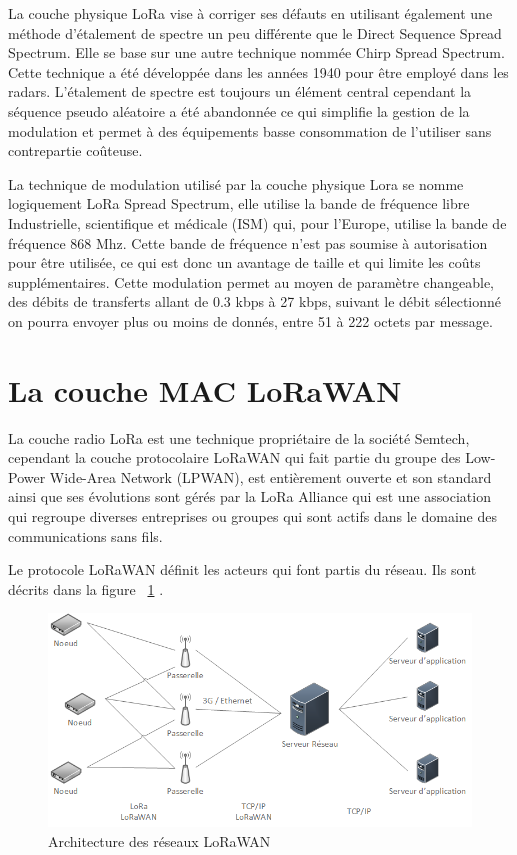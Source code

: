 La couche physique LoRa vise à corriger ses défauts en utilisant également une méthode d’étalement de spectre un peu différente que le Direct Sequence Spread Spectrum. Elle se base sur une autre technique nommée Chirp Spread Spectrum. Cette technique a été développée dans les années 1940 pour être employé dans les radars. L’étalement de spectre est toujours un élément central cependant la séquence pseudo aléatoire a été abandonnée ce qui simplifie la gestion de la modulation et permet à des équipements basse consommation de l’utiliser sans contrepartie coûteuse. \cite{lora_modulation_basics}

La technique de modulation utilisé par la couche physique Lora se nomme logiquement LoRa Spread Spectrum, elle utilise la bande de fréquence libre Industrielle, scientifique et médicale (ISM) qui, pour l’Europe, utilise la bande de fréquence 868 Mhz. Cette bande de fréquence n’est pas soumise à autorisation pour être utilisée, ce qui est donc un avantage de taille et qui limite les coûts supplémentaires. Cette modulation permet au moyen de paramètre changeable, des débits de transferts allant de 0.3 kbps à 27 kbps, suivant le débit sélectionné on pourra envoyer plus ou moins de donnés, entre 51 à 222 octets par message. \cite{limits_lorawan}

\section{La couche MAC LoRaWAN}

La couche radio LoRa est une technique propriétaire de la société Semtech, cependant la couche protocolaire LoRaWAN qui fait partie du groupe des Low-Power Wide-Area Network (LPWAN), est entièrement ouverte et son standard ainsi que ses évolutions sont gérés par la LoRa Alliance qui est une association qui regroupe diverses entreprises ou groupes qui sont actifs dans le domaine des communications sans fils.

Le protocole LoRaWAN définit les acteurs qui font partis du réseau. Ils sont décrits dans la figure ~\ref{fig:schema_lorwan} .

\begin{figure}[htb]
\centering 
\includegraphics[width=1\columnwidth]{../images/schema_lorawan.png} 
\caption[Architecture des réseaux LoRaWAN]{Architecture des réseaux LoRaWAN}
\label{fig:schema_lorwan}
\end{figure}


